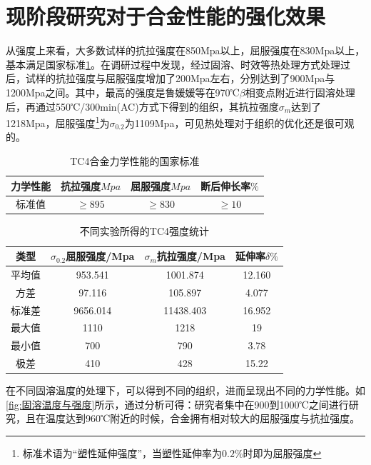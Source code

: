 \documentclass[
class = book,
zihao = -4,
font = noto,
paper = a4paper,
openany
]{easybook}
\begin{document}
\section{现阶段研究对于合金性能的强化效果}
从强度上来看，大多数试样的抗拉强度在850Mpa以上，屈服强度在830Mpa以上，基本满足国家标准\ref{sec:mytc4machin}。在调研过程中发现，经过固溶、时效等热处理方式处理过后，试样的抗拉强度与屈服强度增加了200Mpa左右，分别达到了900Mpa与1200Mpa之间。其中，最高的强度是鲁媛媛等\cite{luyuanyuanShixiaochuliduiTC4taihejinweiguanzuzhihelixuexingnengdeyingxiang2019}在970℃$ \beta $相变点附近进行固溶处理后，再通过550℃/300min(AC)方式下得到的组织，其抗拉强度$ \sigma_m $达到了1218Mpa，屈服强度\footnote{标准术语为“塑性延伸强度”，当塑性延伸率为$0.2\%  $时即为屈服强度}为$ \sigma_{0.2} $为1109Mpa，可见热处理对于组织的优化还是很可观的。
\begin{table}[htbp]
	\centering
	\caption{TC4合金力学性能的国家标准}
	\label{sec:mytc4machin}
	\begin{tabular}{cccc}
		\toprule
		力学性能& 抗拉强度$Mpa  $& 屈服强度$ Mpa $&断后伸长率$ \% $\\ \midrule
		标准值 &$ \ge 895 $&$ \ge 830 $&$ \ge 10 $ \\ \bottomrule
	\end{tabular}
\end{table}


\begin{table}[htbp]
	\centering
	\caption{不同实验所得的TC4强度统计}
	\label{sec:mytcstrengthave}
	\begin{tabular}{cccc}
		\toprule
		类型& $ \sigma_{0.2} $屈服强度/Mpa  &$ \sigma_m $抗拉强度/Mpa &延伸率$ \delta \% $ \\ \midrule
		平均值 & 953.541& 1001.874&12.160 \\
		方差 &97.116& 105.897& 4.077 \\
		标准差 &9656.014&11438.403&16.952 \\
		最大值 &  1110 & 1218 & 19 \\
		最小值&700 & 790 & 3.78 \\
		极差&410 & 428 & 15.22 \\
		\bottomrule
	\end{tabular}
\end{table}




在不同固溶温度的处理下，可以得到不同的组织，进而呈现出不同的力学性能。如\ref{fig:固溶温度与强度}所示，通过分析可得：研究者集中在900到1000℃之间进行研究，且在温度达到960℃附近的时候，合金拥有相对较大的屈服强度与抗拉强度。
\end{document}
